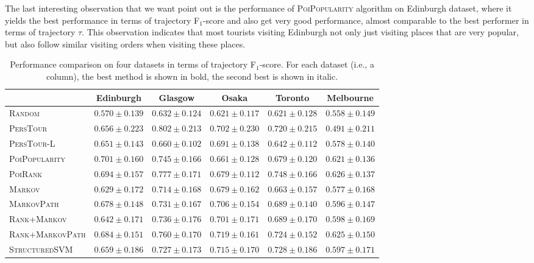 % 
The last interesting observation that we want point out is the performance of \textsc{PoiPopularity} algorithm
on Edinburgh dataset, where it yields the best performance in terms of trajectory F$_1$-score and 
also get very good performance, almost comparable to the best performer in terms of trajectory $\tau$.
This observation indicates that most tourists visiting Edinburgh not only just visiting
places that are very popular, but also follow similar visiting orders when visiting these places.

\begin{table*}
\centering
\begin{tabular}{l|ccccc} \hline
 & Edinburgh & Glasgow & Osaka & Toronto & Melbourne \\ \hline
\textsc{Random} & $0.570\pm0.139$ & $0.632\pm0.124$ & $0.621\pm0.117$ & $0.621\pm0.128$ & $0.558\pm0.149$ \\
\textsc{PersTour}\cite{ijcai15} & $0.656\pm0.223$ & $\mathbf{0.802\pm0.213}$ & $0.702\pm0.230$ & $0.720\pm0.215$ & $0.491\pm0.211$ \\
\textsc{PersTour-L} & $0.651\pm0.143$ & $0.660\pm0.102$ & $0.691\pm0.138$ & $0.642\pm0.112$ & $0.578\pm0.140$ \\
\textsc{PoiPopularity} & $\mathbf{0.701\pm0.160}$ & $0.745\pm0.166$ & $0.661\pm0.128$ & $0.679\pm0.120$ & $0.621\pm0.136$ \\
\textsc{PoiRank} & $\mathit{0.694\pm0.157}$ & $\mathit{0.777\pm0.171}$ & $0.679\pm0.112$ & $\mathbf{0.748\pm0.166}$ & $\mathbf{0.626\pm0.137}$ \\
\textsc{Markov} & $0.629\pm0.172$ & $0.714\pm0.168$ & $0.679\pm0.162$ & $0.663\pm0.157$ & $0.577\pm0.168$ \\
\textsc{MarkovPath} & $0.678\pm0.148$ & $0.731\pm0.167$ & $0.706\pm0.154$ & $0.689\pm0.140$ & $0.596\pm0.147$ \\
\textsc{Rank+Markov} & $0.642\pm0.171$ & $0.736\pm0.176$ & $0.701\pm0.171$ & $0.689\pm0.170$ & $0.598\pm0.169$ \\
\textsc{Rank+MarkovPath} & $0.684\pm0.151$ & $0.760\pm0.170$ & $\mathbf{0.719\pm0.161}$ & $0.724\pm0.152$ & $\mathit{0.625\pm0.150}$ \\
\textsc{StructuredSVM} & $0.659\pm0.186$ & $0.727\pm0.173$ & $\mathit{0.715\pm0.170}$ & $\mathit{0.728\pm0.186}$ & $0.597\pm0.171$ \\
\hline
\end{tabular}
\caption{Performance comparison on four datasets in terms of trajectory F$_1$-score. 
         For each dataset (i.e., a column), the best method is shown in bold, the second best is shown in italic.}
\label{table:f1}
\end{table*}



